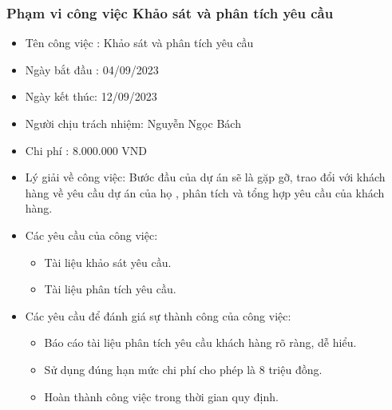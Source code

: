 \documentclass[12pt]{article}
\begin{document}
\subsubsection{Phạm vi công việc Khảo sát và phân tích yêu cầu}
\begin{itemize}[label=-, leftmargin=1cm]
    \item Tên công việc : Khảo sát và phân tích yêu cầu
    \item Ngày bắt đầu : 04/09/2023
    \item Ngày kết thúc: 12/09/2023
    \item Người chịu trách nhiệm: Nguyễn Ngọc Bách
    \item Chi phí : 8.000.000 VND
    \item Lý giải về công việc: Bước đầu của dự án sẽ là gặp gỡ, trao đổi với khách hàng về yêu cầu dự án của họ , phân tích và tổng hợp yêu cầu của khách hàng.
    \item Các yêu cầu của công việc:
    \begin{itemize}[label=+, leftmargin=1cm]
        \item Tài liệu khảo sát yêu cầu.
        \item Tài liệu phân tích yêu cầu.
    \end{itemize}
    \item Các yêu cầu để đánh giá sự thành công của công việc:
    \begin{itemize}[label=+, leftmargin=1cm]
        \item Báo cáo tài liệu phân tích yêu cầu khách hàng rõ ràng, dễ hiểu.
        \item Sử dụng đúng hạn mức chi phí cho phép là 8 triệu đồng.
        \item Hoàn thành công việc trong thời gian quy định.
    \end{itemize}
\end{itemize}
\end{document}
